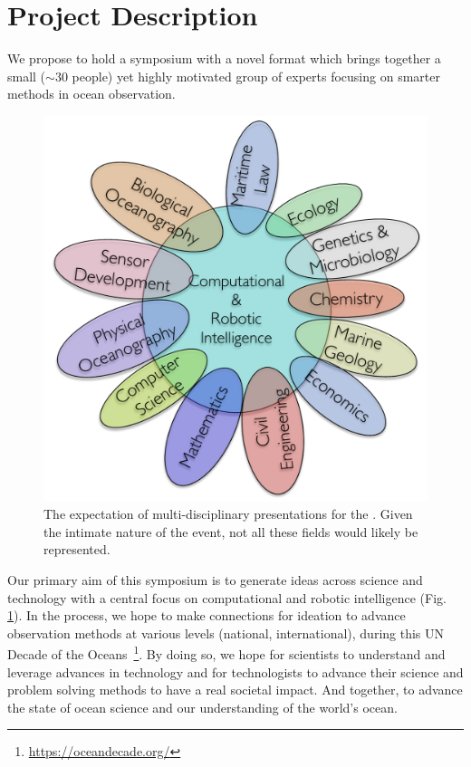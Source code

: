 \section{Project Description}
\label{sec:desc}

\noindent
We propose to hold a symposium with a novel format which brings
together a small ($\sim 30$ people) yet highly motivated group of
experts focusing on smarter methods in ocean observation.

\begin{figure}
  \vspace{-0.5cm}
  \centering 
  \includegraphics[scale=0.4]{fig/disciplines.pdf}
  \caption{The expectation of multi-disciplinary presentations for the
    \sympe. Given the intimate nature of the event, not all these
    fields would likely be represented.}
  \label{fig:concept}
  \vspace{-0.5cm}
\end{figure}

Our primary aim of this symposium is to generate ideas across science
and technology with a central focus on computational and robotic
intelligence (Fig. \ref{fig:concept}).  In the process, we hope to
make connections for ideation to advance observation methods at
various levels (national, international), during this \textsf{UN
  Decade of the Oceans}~\footnote{\url{https://oceandecade.org/}}. By
doing so, we hope for scientists to understand and leverage advances
in technology and for technologists to advance their science and
problem solving methods to have a real societal impact. And together,
to advance the state of ocean science and our understanding of the
world's ocean.

